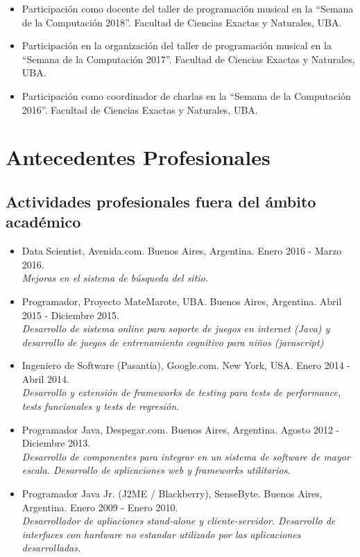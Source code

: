 \documentclass[a4paper,10pt]{article}
\begin{document}
\begin{itemize}
    \item Participación como docente del taller de programación musical en la
        “Semana de la Computación 2018”.
        Facultad de Ciencias Exactas y Naturales, UBA.
    \item Participación en la organización del taller de programación musical
        en la “Semana de la Computación 2017”. Facultad de Ciencias Exactas y
        Naturales, UBA. 
    \item Participación como coordinador de charlas en la “Semana de la
        Computación 2016”. Facultad de Ciencias Exactas y Naturales, UBA. 
\end{itemize}

\section{Antecedentes Profesionales}

\subsection{Actividades profesionales fuera del ámbito académico}

\begin{itemize}
    \item {Data Scientist, Avenida.com. Buenos Aires, Argentina.
            Enero 2016 - Marzo 2016. \\
            {\small \itshape Mejoras en el sistema de búsqueda del sitio.}}

    \item {Programador, Proyecto MateMarote, UBA. Buenos Aires, Argentina.
            Abril 2015 - Diciembre 2015. \\
            {\small \itshape Desarrollo de sistema online para soporte de
        juegos en internet (Java) y desarrollo de juegos de entrenamiento
cognitivo para niños (javascript)}}

    \item {Ingeniero de Software (Pasantía), Google.com. New York, USA. Enero
            2014 - Abril 2014. \\ 
    {\small \itshape Desarrollo y extensión de frameworks de testing para tests
de performance, tests funcionales y tests de regresión.}}

    \item {Programador Java, Despegar.com. Buenos Aires, Argentina. Agosto 2012
           - Diciembre 2013. \\
    {\small \itshape Desarrollo de componentes para integrar en un sistema de
software de mayor escala. Desarrollo de aplicaciones web y frameworks
utilitarios.}}

    \item {Programador Java Jr. (J2ME / Blackberry), SenseByte. Buenos Aires,
            Argentina. Enero 2009 - Enero 2010. \\ 
    {\small \itshape Desarrollador de apliaciones stand-alone y
cliente-servidor.  Desarrollo de interfaces con hardware no estandar utilizado
por las aplicaciones desarrolladas.}}

\end{itemize}
\end{document}
